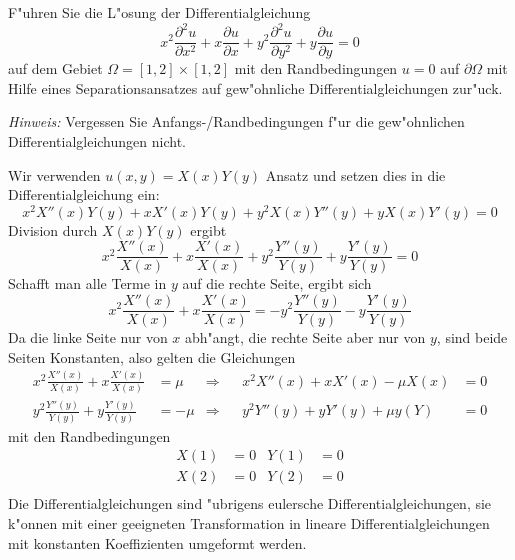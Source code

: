 F"uhren Sie die L"osung der Differentialgleichung
\[
x^2\frac{\partial^2 u}{\partial x^2}
+x\frac{\partial u}{\partial x}
+y^2\frac{\partial^2 u}{\partial y^2}
+y\frac{\partial u}{\partial y}
=0
\]
auf dem Gebiet
$\Omega=[1,2]\times[1,2]$
mit den Randbedingungen
$u=0$ auf $\partial\Omega$
mit Hilfe eines Separationsansatzes auf gew"ohnliche Differentialgleichungen
zur"uck.

{\it Hinweis:} Vergessen Sie Anfangs-/Randbedingungen f"ur die gew"ohnlichen
Differentialgleichungen nicht.

\begin{loesung}
Wir verwenden $u(x,y)=X(x)Y(y)$ Ansatz und setzen dies in die
Differentialgleichung ein:
\[
x^2X''(x)Y(y)
+xX'(x)Y(y)
+y^2X(x)Y''(y)
+yX(x)Y'(y)=0
\]
Division durch $X(x)Y(y)$ ergibt
\[
x^2\frac{X''(x)}{X(x)}
+x\frac{X'(x)}{X(x)}
+y^2\frac{Y''(y)}{Y(y)}
+y\frac{Y'(y)}{Y(y)}=0
\]
Schafft man alle Terme in $y$ auf die rechte Seite, ergibt sich
\[
x^2\frac{X''(x)}{X(x)}
+x\frac{X'(x)}{X(x)}
=
-y^2\frac{Y''(y)}{Y(y)}
-y\frac{Y'(y)}{Y(y)}
\]
Da die linke Seite nur von $x$ abh"angt, die rechte Seite aber nur
von $y$, sind beide Seiten Konstanten, also gelten die
Gleichungen
\begin{align*}
x^2\frac{X''(x)}{X(x)}
+x\frac{X'(x)}{X(x)}&=\mu
&\Rightarrow&
&
x^2X''(x)+xX'(x)-\mu X(x)&=0
\\
y^2\frac{Y''(y)}{Y(y)}
+y\frac{Y'(y)}{Y(y)}&=-\mu
&\Rightarrow&
&
y^2Y''(y)+yY'(y)+\mu y(Y)&=0
\end{align*}
mit den Randbedingungen
\begin{align*}
X(1)&=0&Y(1)&=0\\
X(2)&=0&Y(2)&=0\\
\end{align*}
Die Differentialgleichungen sind "ubrigens eulersche Differentialgleichungen,
sie k"onnen mit einer geeigneten Transformation in lineare
Differentialgleichungen mit konstanten Koeffizienten umgeformt werden.
\end{loesung}
